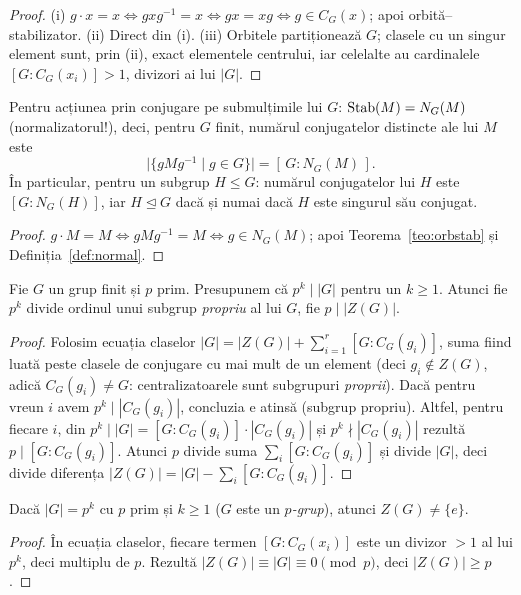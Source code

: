 \begin{proof}
(i) $g\cdot x=x\iff gxg^{-1}=x\iff gx=xg\iff g\in C_G(x)$; apoi orbită--stabilizator. (ii) Direct din (i). (iii) Orbitele partiționează $G$; clasele cu un singur element sunt, prin (ii), exact elementele centrului, iar celelalte au cardinalele $[G:C_G(x_i)]>1$, divizori ai lui $|G|$.
\end{proof}

\begin{teorema}\label{teo:conjsub}
Pentru acțiunea prin conjugare pe submulțimile lui $G$: $\operatorname{Stab}(M)=N_G(M)$ (normalizatorul!), deci, pentru $G$ finit, numărul conjugatelor distincte ale lui $M$ este
\[
\bigl|\{gMg^{-1}\mid g\in G\}\bigr|=[\,G:N_G(M)\,].
\]
În particular, pentru un subgrup $H\le G$: numărul conjugatelor lui $H$ este $[G:N_G(H)]$, iar $H\trianglelefteq G$ dacă și numai dacă $H$ este singurul său conjugat.
\end{teorema}

\begin{proof}
$g\cdot M=M\iff gMg^{-1}=M\iff g\in N_G(M)$; apoi Teorema~\ref{teo:orbstab} și Definiția~\ref{def:normal}.
\end{proof}

\begin{propozitie}[$p^k$ și centrul]\label{prop:pkcentru}
Fie $G$ un grup finit și $p$ prim. Presupunem că $p^k\mid|G|$ pentru un $k\ge1$. Atunci fie $p^k$ divide ordinul unui subgrup \emph{propriu} al lui $G$, fie $p\mid|Z(G)|$.
\end{propozitie}
\begin{proof}
Folosim ecuația claselor $|G|=|Z(G)|+\sum_{i=1}^r[G:C_G(g_i)]$, suma fiind luată peste clasele de conjugare cu mai mult de un element (deci $g_i\notin Z(G)$, adică $C_G(g_i)\neq G$: centralizatoarele sunt subgrupuri \emph{proprii}). Dacă pentru vreun $i$ avem $p^k\mid|C_G(g_i)|$, concluzia e atinsă (subgrup propriu). Altfel, pentru fiecare $i$, din $p^k\mid|G|=[G:C_G(g_i)]\cdot|C_G(g_i)|$ și $p^k\nmid|C_G(g_i)|$ rezultă $p\mid[G:C_G(g_i)]$. Atunci $p$ divide suma $\sum_i[G:C_G(g_i)]$ și divide $|G|$, deci divide diferența $|Z(G)|=|G|-\sum_i[G:C_G(g_i)]$.
\end{proof}

\begin{corolar}\label{cor:pcentru}
Dacă $|G|=p^k$ cu $p$ prim și $k\ge1$ ($G$ este un \emph{$p$-grup}), atunci $Z(G)\neq\{e\}$.
\end{corolar}

\begin{proof}
În ecuația claselor, fiecare termen $[G:C_G(x_i)]$ este un divizor $>1$ al lui $p^k$, deci multiplu de $p$. Rezultă $|Z(G)|\equiv|G|\equiv0\pmod p$, deci $|Z(G)|\ge p$.
\end{proof}

